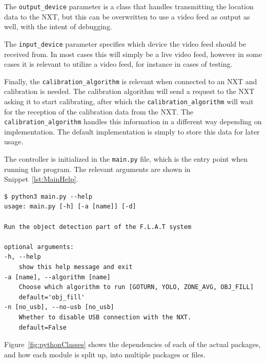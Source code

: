 The \texttt{output\_device} parameter is a class that handles transmitting the location data to the NXT, but this can be overwritten to use a video feed as output as well, with the intent of debugging.


The \texttt{input\_device} parameter specifies which device the video feed should be received from. 
In most cases this will simply be a live video feed, however in some cases it is relevant to utilize a video feed, for instance in cases of testing.

Finally, the \texttt{calibration\_algorithm} is relevant when connected to an NXT and calibration is needed. 
The calibration algorithm will send a request to the NXT asking it to start calibrating, after which the \texttt{calibration\_algorithm} will wait for the reception of the calibration data from the NXT. 
The \texttt{calibration\_algorithm} handles this information in a different way depending on implementation.
The default implementation is simply to store this data for later usage.

The controller is initialized in the \texttt{main.py} file, which is the entry point when running the program. 
The relevant arguments are shown in Snippet~\ref{lst:MainHelp}.
\begin{lstlisting}[label={lst:MainHelp},caption={The help message of the commandline interface}]
$ python3 main.py --help
usage: main.py [-h] [-a [name]] [-d]

Run the object detection part of the F.L.A.T system

optional arguments:
-h, --help            
	show this help message and exit
-a [name], --algorithm [name] 
	Choose which algorithm to run [GOTURN, YOLO, ZONE_AVG, OBJ_FILL]
	default='obj_fill'
-n [no_usb], --no-usb [no_usb]
	Whether to disable USB connection with the NXT.
	default=False
\end{lstlisting}
Figure~\ref{fig:pythonClasses} shows the dependencies of each of the actual packages, and how each module is split up, into multiple packages or files.

